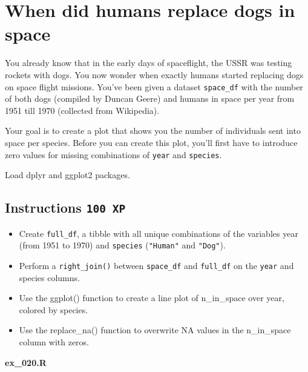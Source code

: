 \documentclass[
  letterpaper,
  DIV=11,
  numbers=noendperiod]{scrreprt}
\providecommand{\tightlist}{%
  \setlength{\itemsep}{0pt}\setlength{\parskip}{0pt}}\usepackage{longtable,booktabs,array}
\begin{document}
\hypertarget{when-did-humans-replace-dogs-in-space}{%
\section{When did humans replace dogs in
space}\label{when-did-humans-replace-dogs-in-space}}

You already know that in the early days of spaceflight, the USSR was
testing rockets with dogs. You now wonder when exactly humans started
replacing dogs on space flight missions. You've been given a dataset
\texttt{space\_df} with the number of both dogs (compiled by Duncan
Geere) and humans in space per year from 1951 till 1970 (collected from
Wikipedia).

Your goal is to create a plot that shows you the number of individuals
sent into space per species. Before you can create this plot, you'll
first have to introduce zero values for missing combinations of
\texttt{year} and \texttt{species}.

Load dplyr and ggplot2 packages.

\hypertarget{instructions-100-xp-17}{%
\subsection*{\texorpdfstring{Instructions
\texttt{100\ XP}}{Instructions 100 XP}}\label{instructions-100-xp-17}}

\begin{itemize}
\tightlist
\item
  Create \texttt{full\_df}, a tibble with all unique combinations of the
  variables year (from 1951 to 1970) and \texttt{species}
  (\texttt{"Human"} and \texttt{"Dog"}).
\item
  Perform a \texttt{right\_join()} between \texttt{space\_df} and
  \texttt{full\_df} on the \texttt{year} and species columns.
\item
  Use the ggplot() function to create a line plot of n\_in\_space over
  year, colored by species.
\item
  Use the replace\_na() function to overwrite NA values in the
  n\_in\_space column with zeros.
\end{itemize}

\textbf{ex\_020.R}
\end{document}
